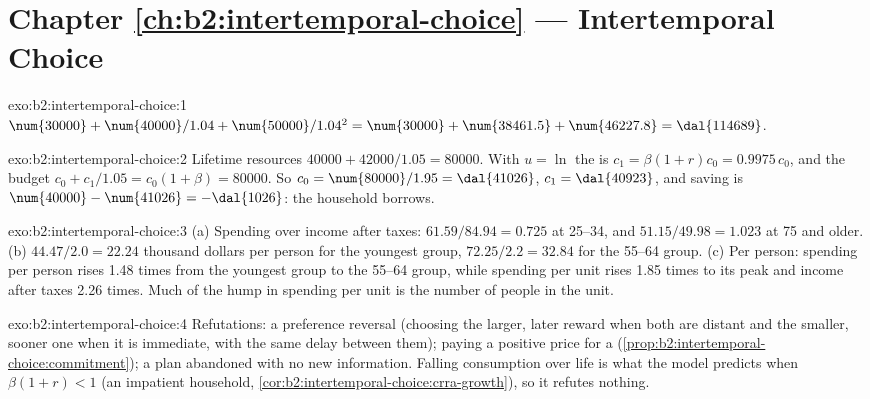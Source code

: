 \section*{Chapter \ref{ch:b2:intertemporal-choice} --- Intertemporal Choice}

\begin{solution}{exo:b2:intertemporal-choice:1}
$\num{30000} + \num{40000}/1.04 + \num{50000}/1.04^2 = \num{30000} + \num{38461.5} + \num{46227.8} =
\dal{114689}$.
\end{solution}

\begin{solution}{exo:b2:intertemporal-choice:2}
Lifetime resources $\num{40000} + \num{42000}/1.05 = \num{80000}$. With $u = \ln$ the  is
$c_1 = \beta(1 + r)c_0 = 0.9975\,c_0$, and the budget $c_0 + c_1/1.05 = c_0(1 + \beta) = \num{80000}$.
So $c_0 = \num{80000}/1.95 = \dal{41026}$, $c_1 = \dal{40923}$, and saving is $\num{40000} -
\num{41026} = -\dal{1026}$: the household borrows.
\end{solution}

\begin{solution}{exo:b2:intertemporal-choice:3}
(a) Spending over income after taxes: $61.59/84.94 = 0.725$ at 25--34, and $51.15/49.98 = 1.023$ at 75
and older. (b) $44.47/2.0 = 22.24$ thousand dollars per person for the youngest group, $72.25/2.2 = 32.84$
for the 55--64 group. (c) Per person: spending per person rises 1.48 times from the youngest group to
the 55--64 group, while spending per unit rises 1.85 times to its peak and income after taxes 2.26
times. Much of the hump in spending per unit is the number of people in the unit.
\end{solution}

\begin{solution}{exo:b2:intertemporal-choice:4}
Refutations: a preference reversal (choosing the larger, later reward when both are distant and the
smaller, sooner one when it is immediate, with the same delay between them); paying a positive price
for a  (\cref{prop:b2:intertemporal-choice:commitment}); a plan abandoned with no
new information. Falling consumption over life is what the model predicts when $\beta(1 + r) < 1$ (an
impatient household, \cref{cor:b2:intertemporal-choice:crra-growth}), so it refutes nothing.
\end{solution}

